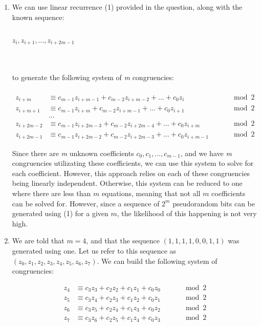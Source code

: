 \documentclass[11pt]{article}
\theoremstyle{definition}
\begin{document}
\begin{enumerate}
\begin{enumerate}
\item We can use linear recurrence (1) provided in the question, along with the known sequence: \\ \\
\centerline{$z_{i}, z_{i+1}, \ldots , z_{i+2m-1}$}
\\ \\
to generate the following system of \textit{m} congruencies:\\ \\
\begin{align*}
z_{i+m} &\equiv c_{m-1} z_{i+m-1} + c_{m-2} z_{i+m-2} + \ldots + c_0 z_i \qquad &\mod{2}\\
z_{i+m+1} &\equiv c_{m-1} z_{i+m} + c_{m-2} z_{i+m-1} + \ldots + c_0 z_{i+1} \qquad &\mod{2}\\
&\ldots \\
z_{i+2m-2} &\equiv c_{m-1} z_{i+2m-3} + c_{m-2} z_{i+2m-4} + \ldots + c_0 z_{i+m} \qquad &\mod{2}\\
z_{i+2m-1} &\equiv c_{m-1} z_{i+2m-2} + c_{m-2} z_{i+2m-3} + \ldots + c_0 z_{i+m-1} \qquad &\mod{2}
\end{align*}

Since there are \textit{m} unknown coefficients $c_0, c_1, \ldots , c_{m-1}$, and we have \textit{m} congruencies utilizating these coefficients, we can use this system to solve for each coefficient. 
However, this approach relies on each of these congruencies being linearly independent. Otherwise, this system can be reduced to one where there are less than $m$ equations, meaning that not all $m$ coefficients can be solved for. However, since a sequence
of $2^m$ pseudorandom bits can be generated using (1) for a given $m$, the likelihood of this happening is not very high.

\item We are told that $m = 4$, and that the sequence $(1, 1, 1, 1, 0, 0, 1, 1)$ was generated using one. Let us refer to this sequence as $(z_0, z_1, z_2, z_3, z_4, z_5, z_6, z_7)$. We can build the following system of congruencies:

\begin{align*}
z_4 &\equiv c_3  z_3 + c_2  z_2 + c_1  z_1 + c_0  z_0 \qquad &\mod{2}\\
z_5 &\equiv c_3  z_4 + c_2  z_3 + c_1  z_2 + c_0  z_1 \qquad &\mod{2}\\
z_6 &\equiv c_3  z_5 + c_2  z_4 + c_1  z_3 + c_0  z_2 \qquad &\mod{2}\\
z_7 &\equiv c_3  z_6 + c_2  z_5 + c_1  z_4 + c_0  z_3 \qquad &\mod{2}
\end{align*}


\end{enumerate}
\end{enumerate}
\end{document}
